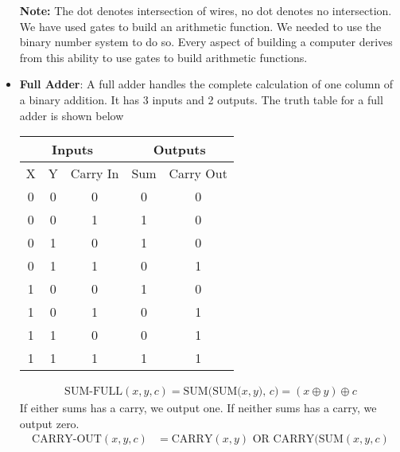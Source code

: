 \documentclass{report}
\begin{document}
\begin{itemize}
            \bigbreak \noindent 
            \textbf{Note:} The dot denotes intersection of wires, no dot denotes no intersection.
            \bigbreak \noindent 
            We have used gates to build an arithmetic function. We needed to use the binary number system to do so. Every aspect of building a computer derives from this ability to use gates to build arithmetic functions.
        \item \textbf{Full Adder}: A full adder handles the complete calculation of one column of a binary addition.
            \bigbreak \noindent 
            It has 3 inputs and 2 outputs.
            \bigbreak \noindent 
            The truth table for a full adder is shown below
            \bigbreak \noindent 
            \begin{center}
                \begin{tabular}{|c c c|c c|}
                    \hline
                    \multicolumn{3}{|c|}{\textbf{Inputs}} & \multicolumn{2}{c|}{\textbf{Outputs}} \\
                    \hline
                    X & Y & Carry In & Sum & Carry Out \\
                    \hline
                    0 & 0 & 0 & 0 & 0 \\
                    0 & 0 & 1 & 1 & 0 \\
                    0 & 1 & 0 & 1 & 0 \\
                    0 & 1 & 1 & 0 & 1 \\
                    1 & 0 & 0 & 1 & 0 \\
                    1 & 0 & 1 & 0 & 1 \\
                    1 & 1 & 0 & 0 & 1 \\
                    1 & 1 & 1 & 1 & 1 \\
                    \hline
                \end{tabular} 
            \end{center}
            \bigbreak \noindent 
            \begin{align*}
                \text{SUM-FULL}(x,y,c) = \text{SUM(SUM($x,y$), $c$)} = (x\oplus y) \oplus c
            \end{align*}
            \bigbreak \noindent 
            \bigbreak \noindent 
            If either sums has a carry, we output one. If neither sums has a carry, we output zero.
            \begin{align*}
                \text{CARRY-OUT}(x,y,c) &= \text{CARRY}(x,y) \text{ OR } \text{CARRY}(\text{SUM}(x,y,c) \\

\end{align*}
\end{itemize}
\end{document}
